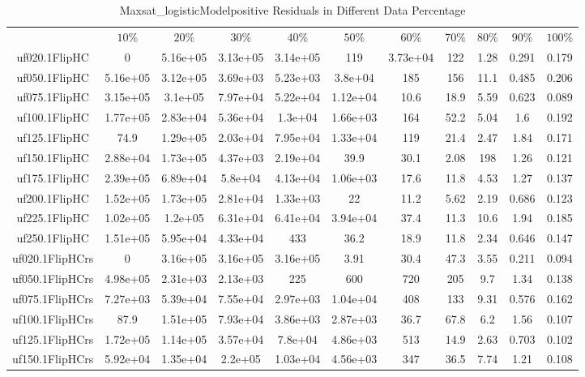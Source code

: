 \begin{table}[htbp]
\caption{Maxsat_logisticModelpositive Residuals in Different Data Percentage}
\centering
\begin{tabular}{|ccccccccccc|}
\hline
 & $10\%$ & $20\%$ & $30\%$ & $40\%$ & $50\%$ & $60\%$ & $70\%$ & $80\%$ & $90\%$ & $100\%$ \\
uf020.1FlipHC &    0 & 5.16e+05 & 3.13e+05 & 3.14e+05 &  119 & 3.73e+04 &  122 & 1.28 & 0.291 & 0.179 \\
uf050.1FlipHC & 5.16e+05 & 3.12e+05 & 3.69e+03 & 5.23e+03 & 3.8e+04 &  185 &  156 & 11.1 & 0.485 & 0.206 \\
uf075.1FlipHC & 3.15e+05 & 3.1e+05 & 7.97e+04 & 5.22e+04 & 1.12e+04 & 10.6 & 18.9 & 5.59 & 0.623 & 0.089 \\
uf100.1FlipHC & 1.77e+05 & 2.83e+04 & 5.36e+04 & 1.3e+04 & 1.66e+03 &  164 & 52.2 & 5.04 &  1.6 & 0.192 \\
uf125.1FlipHC & 74.9 & 1.29e+05 & 2.03e+04 & 7.95e+04 & 1.33e+04 &  119 & 21.4 & 2.47 & 1.84 & 0.171 \\
uf150.1FlipHC & 2.88e+04 & 1.73e+05 & 4.37e+03 & 2.19e+04 & 39.9 & 30.1 & 2.08 &  198 & 1.26 & 0.121 \\
uf175.1FlipHC & 2.39e+05 & 6.89e+04 & 5.8e+04 & 4.13e+04 & 1.06e+03 & 17.6 & 11.8 & 4.53 & 1.27 & 0.137 \\
uf200.1FlipHC & 1.52e+05 & 1.73e+05 & 2.81e+04 & 1.33e+03 &   22 & 11.2 & 5.62 & 2.19 & 0.686 & 0.123 \\
uf225.1FlipHC & 1.02e+05 & 1.2e+05 & 6.31e+04 & 6.41e+04 & 3.94e+04 & 37.4 & 11.3 & 10.6 & 1.94 & 0.185 \\
uf250.1FlipHC & 1.51e+05 & 5.95e+04 & 4.33e+04 &  433 & 36.2 & 18.9 & 11.8 & 2.34 & 0.646 & 0.147 \\
uf020.1FlipHCrs &    0 & 3.16e+05 & 3.16e+05 & 3.16e+05 & 3.91 & 30.4 & 47.3 & 3.55 & 0.211 & 0.094 \\
uf050.1FlipHCrs & 4.98e+05 & 2.31e+03 & 2.13e+03 &  225 &  600 &  720 &  205 &  9.7 & 1.34 & 0.138 \\
uf075.1FlipHCrs & 7.27e+03 & 5.39e+04 & 7.55e+04 & 2.97e+03 & 1.04e+04 &  408 &  133 & 9.31 & 0.576 & 0.162 \\
uf100.1FlipHCrs & 87.9 & 1.51e+05 & 7.93e+04 & 3.86e+03 & 2.87e+03 & 36.7 & 67.8 &  6.2 & 1.56 & 0.107 \\
uf125.1FlipHCrs & 1.72e+05 & 1.14e+05 & 3.57e+04 & 7.8e+04 & 4.86e+03 &  513 & 14.9 & 2.63 & 0.703 & 0.102 \\
uf150.1FlipHCrs & 5.92e+04 & 1.35e+04 & 2.2e+05 & 1.03e+04 & 4.56e+03 &  347 & 36.5 & 7.74 & 1.21 & 0.108 \\

\end{tabular}
\end{table}
